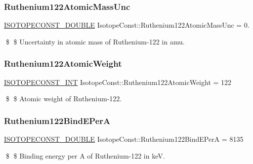 \subsubsection{\texorpdfstring{Ruthenium122\+Atomic\+Mass\+Unc}{Ruthenium122AtomicMassUnc}}
{\footnotesize\ttfamily \mbox{\hyperlink{group___isotope_const-_macros_ga8f45a7272ce02c0b4c65c44636ed719a}{I\+S\+O\+T\+O\+P\+E\+C\+O\+N\+S\+T\+\_\+\+D\+O\+U\+B\+LE}} Isotope\+Const\+::\+Ruthenium122\+Atomic\+Mass\+Unc = 0.}

\$ \$ Uncertainty in atomic mass of Ruthenium-\/122 in amu. \mbox{\label{group___isotope_const-_ruthenium-_ru122_gab1e0ea777b65be15668cccafe8f3283e}} 
\subsubsection{\texorpdfstring{Ruthenium122\+Atomic\+Weight}{Ruthenium122AtomicWeight}}
{\footnotesize\ttfamily \mbox{\hyperlink{group___isotope_const-_macros_ga5f18360b3e99483a35c32d789e62621c}{I\+S\+O\+T\+O\+P\+E\+C\+O\+N\+S\+T\+\_\+\+I\+NT}} Isotope\+Const\+::\+Ruthenium122\+Atomic\+Weight = 122}

\$ \$ Atomic weight of Ruthenium-\/122. \mbox{\label{group___isotope_const-_ruthenium-_ru122_ga0a99e48fd0a802158a20614cbc25337b}} 
\subsubsection{\texorpdfstring{Ruthenium122\+Bind\+E\+PerA}{Ruthenium122BindEPerA}}
{\footnotesize\ttfamily \mbox{\hyperlink{group___isotope_const-_macros_ga8f45a7272ce02c0b4c65c44636ed719a}{I\+S\+O\+T\+O\+P\+E\+C\+O\+N\+S\+T\+\_\+\+D\+O\+U\+B\+LE}} Isotope\+Const\+::\+Ruthenium122\+Bind\+E\+PerA = 8135}

\$ \$ Binding energy per A of Ruthenium-\/122 in keV. \mbox{\label{group___isotope_const-_ruthenium-_ru122_gacba11c1cc3d0409a47c967640eef67bc}} 
